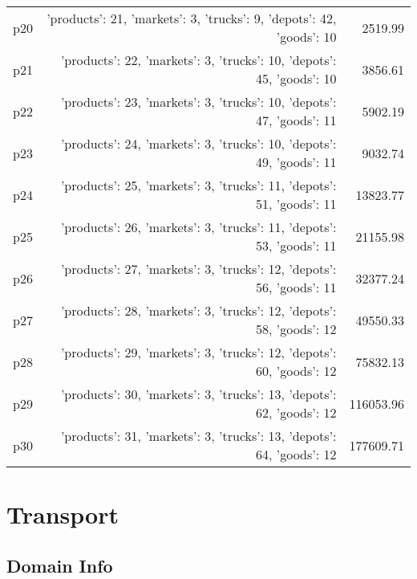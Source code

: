 \documentclass{article}
\begin{document}
\begin{center}
\begin{tabular}{@{}l|r|r@{}}
  p20&{'products': 21, 'markets': 3, 'trucks': 9, 'depots': 42, 'goods': 10}&2519.99\\
  p21&{'products': 22, 'markets': 3, 'trucks': 10, 'depots': 45, 'goods': 10}&3856.61\\
  p22&{'products': 23, 'markets': 3, 'trucks': 10, 'depots': 47, 'goods': 11}&5902.19\\
  p23&{'products': 24, 'markets': 3, 'trucks': 10, 'depots': 49, 'goods': 11}&9032.74\\
  p24&{'products': 25, 'markets': 3, 'trucks': 11, 'depots': 51, 'goods': 11}&13823.77\\
  p25&{'products': 26, 'markets': 3, 'trucks': 11, 'depots': 53, 'goods': 11}&21155.98\\
  p26&{'products': 27, 'markets': 3, 'trucks': 12, 'depots': 56, 'goods': 11}&32377.24\\
  p27&{'products': 28, 'markets': 3, 'trucks': 12, 'depots': 58, 'goods': 12}&49550.33\\
  p28&{'products': 29, 'markets': 3, 'trucks': 12, 'depots': 60, 'goods': 12}&75832.13\\
  p29&{'products': 30, 'markets': 3, 'trucks': 13, 'depots': 62, 'goods': 12}&116053.96\\
  p30&{'products': 31, 'markets': 3, 'trucks': 13, 'depots': 64, 'goods': 12}&177609.71
                            \end{tabular}
                            \end{center}
                    
                            \newpage \section{Transport}
                    \subsection*{Domain Info}
\end{document}
